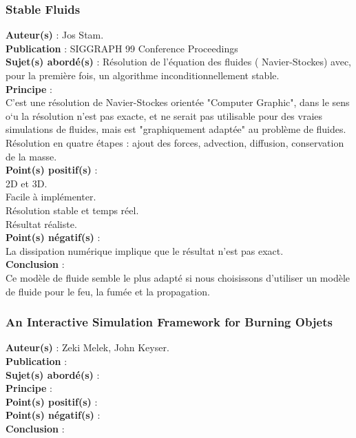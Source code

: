 \documentclass[a4paper,10pt]{article}
\begin{document}
\subsubsection{Stable Fluids}
\textbf{Auteur(s)} : Jos Stam.\\
\textbf{Publication} : SIGGRAPH 99 Conference Proceedings\\
\textbf{Sujet(s) abordé(s)} : Résolution de l'équation des fluides ( Navier-Stockes) avec, pour la première fois, un algorithme inconditionnellement stable.\\
\textbf{Principe} :\\
C'est une résolution de Navier-Stockes orientée "Computer Graphic", dans le sens o`u la résolution n'est pas exacte, et ne serait pas utilisable pour des vraies simulations de fluides, mais est "graphiquement adaptée" au problème de fluides.\\
Résolution en quatre étapes : ajout des forces, advection, diffusion, conservation de la masse.\\
\textbf{Point(s) positif(s)} : \\
2D et 3D.\\
Facile à implémenter.\\
Résolution stable et temps réel.\\
Résultat réaliste.\\
\textbf{Point(s) négatif(s)} :\\
La dissipation numérique implique que le résultat n'est pas exact.\\
\textbf{Conclusion} :\\
Ce modèle de fluide semble le plus adapté si nous choisissons d'utiliser un modèle de fluide pour le feu, la fumée et la propagation.


\subsubsection{An Interactive Simulation Framework for Burning Objets}
\textbf{Auteur(s)} : Zeki Melek, John Keyser.\\
\textbf{Publication} :\\
\textbf{Sujet(s) abordé(s)} : \\
\textbf{Principe} :\\	
\textbf{Point(s) positif(s)} :\\
\textbf{Point(s) négatif(s)} :\\
\textbf{Conclusion} :\\
\end{document}
